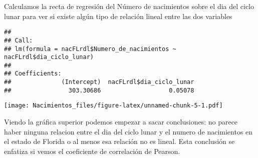 \documentclass[
]{article}
\newenvironment{Shaded}{\begin{snugshade}}{\end{snugshade}}
\newcommand{\FunctionTok}[1]{\textcolor[rgb]{0.00,0.00,0.00}{#1}}
\newcommand{\NormalTok}[1]{#1}
\newcommand{\OtherTok}[1]{\textcolor[rgb]{0.56,0.35,0.01}{#1}}
\newcommand{\SpecialCharTok}[1]{\textcolor[rgb]{0.00,0.00,0.00}{#1}}
\begin{document}
Calculamos la recta de regresión del Número de nacimientos sobre el dia
del ciclo lunar para ver si existe algún tipo de relación lineal entre
las dos variables

\begin{Shaded}
\end{Shaded}

\begin{verbatim}
## 
## Call:
## lm(formula = nacFLrdl$Numero_de_nacimientos ~ nacFLrdl$dia_ciclo_lunar)
## 
## Coefficients:
##              (Intercept)  nacFLrdl$dia_ciclo_lunar  
##                303.30686                   0.05078
\end{verbatim}

\begin{Shaded}
\end{Shaded}

\texttt{[image: Nacimientos\_files/figure-latex/unnamed-chunk-5-1.pdf]}

Viendo la gráfica superior podemos empezar a sacar conclusiones: no
parece haber ninguna relacion entre el dia del ciclo lunar y el numero
de nacimientos en el estado de Florida o al menos esa relación no es
lineal. Esta conclusión se enfatiza si vemos el coeficiente de
correlación de Pearson.

\begin{Shaded}
\end{Shaded}
\end{document}
